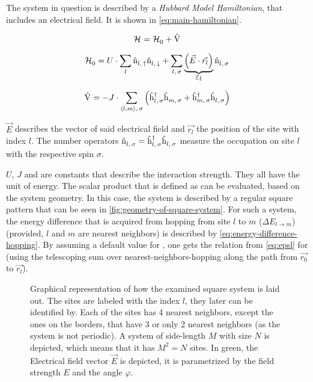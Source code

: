 The system in question is described by a \emph{Hubbard Model Hamiltonian}, that includes an electrical field. It is shown in \autoref{eq:main-hamiltonian}.


\begin{equation}
    \label{eq:main-hamiltonian}
    \pictureHamiltonian = \HzeroHamiltonian + \Vhamiltonian
\end{equation}

\begin{equation}
    \label{eq:main-hamiltonian-h0}
    \HzeroHamiltonian = U \cdot \lsum \nop{l}{\up}\nop{l}{\down} + \lsum[l,\,\sigma] \underbrace{\left(\vec{E} \cdot \vec{r_l}\right)}_{\text{\normalsize \epsl}} \nop{l}{\sigma}
\end{equation}

\begin{equation}
    \label{eq:main-hamiltonian-perturbation}
    \Vhamiltonian =  - J \cdot \neighborsumWSpin{l}{m}{\sigma} \left(\withspinhcop{l}{\sigma}{\dagger} \withspinhcop{m}{\sigma}{} + \withspinhcop{m}{\sigma}{\dagger} \withspinhcop{l}{\sigma}{} \right)
\end{equation}

$\vec{E}$ describes the vector of said electrical field and $\vec{r_l}$ the position of the site with index $l$.
The number operators $\hat{\text{n}}^{ }_{l,\,\sigma} = \hat{\text{h}}^{\dagger }_{l,\,\sigma}\hat{\text{h}}^{ }_{l,\,\sigma}$ measure the occupation on site $l$ with the respective spin $\sigma$. 

$U$, $J$ and \epsl[] are constants that describe the interaction strength. 
They all have the unit of energy. 
The scalar product that is defined as \epsl[] can be evaluated, based on the system geometry. 
In this case, the system is described by a regular square pattern that can be seen in \autoref{fig:geometry-of-square-system}. 
For such a system, the energy difference that is acquired from hopping from site $l$ to $m$ ($\Delta E_{l \rightarrow m}$) (provided, $l$ and $m$ are nearest neighbors) is described by \autoref{eq:energy-difference-hopping}. By assuming a default value for \epsl[0], one gets the relation from \autoref{eq:epsl} for \epsl{} (using the telescoping sum over nearest-neighbors-hopping along the path from $\vec{r_0}$ to $\vec{r_l}$). 

\begin{figure}[htbp]
    \centering
            
    \vspace{0.8cm}
    \caption{Graphical representation of how the examined square system is laid out. The sites are labeled with the index $l$, they later can be identified by. Each of the sites has 4 nearest neighbors, except the ones on the borders, that have 3 or only 2 nearest neighbors (as the system is not periodic). A system of side-length $M$ with size $N$ is depicted, which means that it has $M^2 = N$ sites.
    In green, the Electrical field vector $\vec{E}$ is depicted, it is parametrized by the field strength $E$ and the angle $\varphi$.}
    \label{fig:geometry-of-square-system}
\end{figure}

